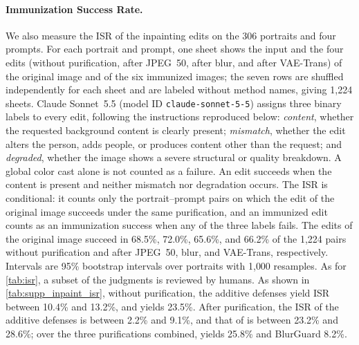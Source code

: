 \paragraph{Immunization Success Rate.} We also measure the ISR of the inpainting edits on the 306 portraits and four prompts. For each portrait and prompt, one sheet shows the input and the four edits (without purification, after JPEG~50, after blur, and after VAE-Trans) of the original image and of the six immunized images; the seven rows are shuffled independently for each sheet and are labeled without method names, giving 1{,}224 sheets. Claude Sonnet~5.5 (model ID \texttt{claude-sonnet-5-5}) assigns three binary labels to every edit, following the instructions reproduced below: \emph{content}, whether the requested background content is clearly present; \emph{mismatch}, whether the edit alters the person, adds people, or produces content other than the request; and \emph{degraded}, whether the image shows a severe structural or quality breakdown. A global color cast alone is not counted as a failure. An edit succeeds when the content is present and neither mismatch nor degradation occurs. The ISR is conditional: it counts only the portrait--prompt pairs on which the edit of the original image succeeds under the same purification, and an immunized edit counts as an immunization success when any of the three labels fails. The edits of the original image succeed in 68.5\%, 72.0\%, 65.6\%, and 66.2\% of the 1{,}224 pairs without purification and after JPEG~50, blur, and VAE-Trans, respectively. Intervals are 95\% bootstrap intervals over portraits with 1{,}000 resamples. As for \cref{tab:isr}, a subset of the judgments is reviewed by humans. As shown in \cref{tab:supp_inpaint_isr}, without purification, the additive defenses yield ISR between 10.4\% and 13.2\%, and \capg{} yields 23.5\%. After purification, the ISR of the additive defenses is between 2.2\% and 9.1\%, and that of \capg{} is between 23.2\% and 28.6\%; over the three purifications combined, \capg{} yields 25.8\% and BlurGuard 8.2\%.

